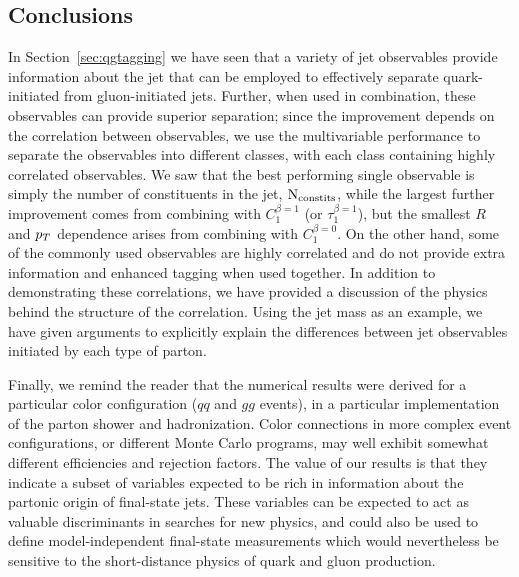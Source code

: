  \subsection{Conclusions}\label{sec:qg_concl}

In Section~\ref{sec:qgtagging} we have seen that a variety of jet observables
 provide information about the jet that can be employed  to effectively separate quark-initiated from gluon-initiated jets.  Further,
when used in combination, these observables can provide superior separation; since the improvement depends on the correlation between observables,
we use the multivariable performance to separate the observables into different classes, with each class containing highly correlated observables.  
We saw that the best performing single observable is simply the number of
constituents in the jet, $\rm{N_ {constits}}$,  while the largest further improvement comes from combining with $C_1^{\beta =1}$ (or $\tau_1^{\beta=1}$), 
but the smallest
$R$ and $p_T$ dependence arises from combining with $C_1^{\beta = 0}$.  On the other hand, some of the commonly used observables are highly correlated
and do not provide extra information and enhanced tagging when used together.  In addition to demonstrating these correlations, we have provided a discussion of the 
physics behind the structure of the correlation.  Using the jet mass as an example, we have given arguments to explicitly explain the differences between jet observables 
initiated by each type of parton. 


Finally, we remind the reader that the numerical results were derived for a particular color
configuration ($qq$ and $gg$ events), in a particular implementation of the parton shower and hadronization. Color
connections in more complex event configurations, or different Monte Carlo programs,
may well exhibit somewhat different efficiencies and rejection factors. The value of our results
is that they indicate a subset of variables expected to be rich in information about
the partonic origin of final-state jets. These variables can  be expected to act as valuable
discriminants in searches for new physics, and could also be used to define 
model-independent final-state measurements which would nevertheless be sensitive to the
short-distance physics of quark and gluon production.
 